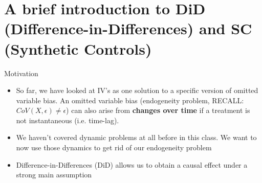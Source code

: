 \documentclass[10pt, oneside]{article}
\begin{document}
\section{A brief introduction to DiD (Difference-in-Differences) and SC (Synthetic Controls)}
Motivation
\begin{itemize}
    \item So far, we have looked at IV's as one solution to a specific version of omitted variable bias. An omitted variable bias (endogeneity problem, RECALL: $CoV(X,\epsilon) \neq \epsilon$) can also arise from \textbf{changes over time} if a treatment is not instantaneous (i.e. time-lag).
    \item We haven't covered dynamic problems at all before in this class. We want to now use those dynamics to get rid of our endogeneity problem
    \item Difference-in-Differences (DiD) allows us to obtain a causal effect under a strong main assumption
\end{itemize}
\end{document}
